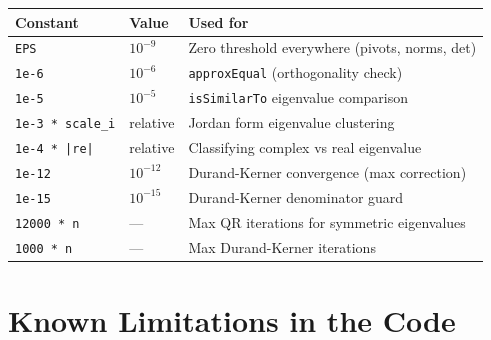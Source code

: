 \documentclass[12pt, a4paper]{article}
\newcommand{\code}[1]{\texttt{\small#1}}
\newcommand{\fn}[1]{\texttt{\small\color{funcgreen}#1}}
\begin{document}
\begin{center}
\small
\renewcommand{\arraystretch}{1.4}
\begin{tabular}{lll}
\toprule
Constant & Value & Used for \\
\midrule
\code{EPS} & $10^{-9}$ & Zero threshold everywhere (pivots, norms, det) \\
\code{1e-6} & $10^{-6}$ & \fn{approxEqual} (orthogonality check) \\
\code{1e-5} & $10^{-5}$ & \fn{isSimilarTo} eigenvalue comparison \\
\code{1e-3 * scale\_i} & relative & Jordan form eigenvalue clustering \\
\code{1e-4 * |re|} & relative & Classifying complex vs real eigenvalue \\
\code{1e-12} & $10^{-12}$ & Durand-Kerner convergence (max correction) \\
\code{1e-15} & $10^{-15}$ & Durand-Kerner denominator guard \\
\code{12000 * n} & --- & Max QR iterations for symmetric eigenvalues \\
\code{1000 * n} & --- & Max Durand-Kerner iterations \\
\bottomrule
\end{tabular}
\end{center}

\section{Known Limitations in the Code}
\end{document}
